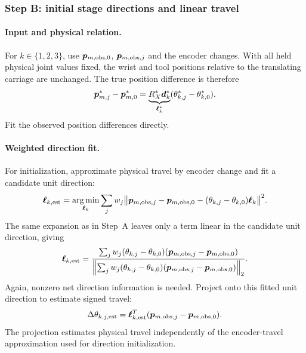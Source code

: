 \documentclass[../main.tex]{subfiles}
\begin{document}
\subsubsection{Step B: initial stage directions and linear travel}\label{sec:math-stepB}
\paragraph{Input and physical relation.}
For $k\in\{1,2,3\}$, use $\bm{p}_{m,\mathrm{obs},0}$, $\bm{p}_{m,\mathrm{obs},j}$ and the encoder changes. With all held physical joint values fixed, the wrist and tool positions relative to the translating carriage are unchanged. The true position difference is therefore
\begin{equation}\label{eq:stage-line}
\bm{p}_{m,j}^*-\bm{p}_{m,0}^*
=\underbrace{R_X^*\bm{d}_k^*}_{\bm{\ell}_k^*}
(\theta^*_{k,j}-\theta^*_{k,0}).
\end{equation}
Fit the observed position differences directly.

\paragraph{Weighted direction fit.}
For initialization, approximate physical travel by encoder change and fit a candidate unit direction:
\begin{equation}\label{eq:stepB}
\begin{aligned}
\bm{\ell}_{k,\mathrm{est}}
=\underset{\bm{\ell}_k}{\arg\min}\sum_jw_j
\bigl\|\bm{p}_{m,\mathrm{obs},j}-\bm{p}_{m,\mathrm{obs},0}
-(\theta_{k,j}-\theta_{k,0})\bm{\ell}_k\bigr\|^2.
\end{aligned}
\end{equation}
The same expansion as in Step~A leaves only a term linear in the candidate unit direction, giving
\begin{equation*}
\bm{\ell}_{k,\mathrm{est}}=
\frac{\sum_jw_j(\theta_{k,j}-\theta_{k,0})(\bm{p}_{m,\mathrm{obs},j}-\bm{p}_{m,\mathrm{obs},0})}
{\left\|\sum_jw_j(\theta_{k,j}-\theta_{k,0})(\bm{p}_{m,\mathrm{obs},j}-\bm{p}_{m,\mathrm{obs},0})\right\|_2}.
\end{equation*}
Again, nonzero net direction information is needed. Project onto this fitted unit direction to estimate signed travel:
\begin{equation*}
\Delta\theta_{k,j,\mathrm{est}}=
\bm{\ell}_{k,\mathrm{est}}^T(\bm{p}_{m,\mathrm{obs},j}-\bm{p}_{m,\mathrm{obs},0}).
\end{equation*}
The projection estimates physical travel independently of the encoder-travel approximation used for direction initialization.
\end{document}
